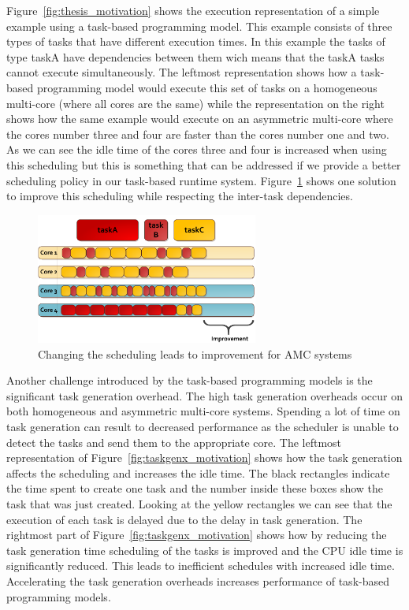 Figure~\ref{fig:thesis_motivation} shows the execution representation of a simple example using a task-based programming model.
This example consists of three types of tasks that have different execution times.
In this example the tasks of type taskA have dependencies between them wich means that the taskA tasks cannot execute simultaneously. 
The leftmost representation shows how a task-based programming model would execute this set of tasks on a homogeneous multi-core (where all cores are the same) while the representation on the right shows how the same example would execute on an asymmetric multi-core where the cores number three and four are faster than the cores number one and two.
As we can see the idle time of the cores three and four is increased when using this scheduling but this is something that can be addressed if we provide a better scheduling policy in our task-based runtime system.
Figure~\ref{fig:thesis_motivation2} shows one solution to improve this scheduling while respecting the inter-task dependencies.
\begin{figure}[t]%
	\centering
	\includegraphics[width=0.65\textwidth]{figures/thesis_motivation2.pdf}
	\caption{Changing the scheduling leads to improvement for AMC systems}
	\label{fig:thesis_motivation2}
\end{figure}

Another challenge introduced by the task-based programming models is the significant task generation overhead.
The high task generation overheads occur on both homogeneous and asymmetric multi-core systems.
Spending a lot of time on task generation can result to decreased performance as the scheduler is unable to detect the tasks and send them to the appropriate core.
The leftmost representation of Figure~\ref{fig:taskgenx_motivation} shows how the task generation affects the scheduling and increases the idle time.
The black rectangles indicate the time spent to create one task and the number inside these boxes show the task that was just created.
Looking at the yellow rectangles we can see that the execution of each task is delayed due to the delay in task generation.
The rightmost part of Figure~\ref{fig:taskgenx_motivation} shows how by reducing the task generation time scheduling of the tasks is improved and the CPU idle time is significantly reduced.
This leads to inefficient schedules with increased idle time.
Accelerating the task generation overheads increases performance of task-based programming models.

